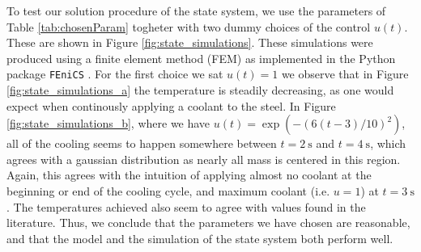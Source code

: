 To test our solution procedure of the state system, we use the parameters of Table \ref{tab:chosenParam} togheter with two dummy choices of the control $u(t)$. These are shown in Figure \ref{fig:state_simulations}. These simulations were produced using a finite element method (FEM) as implemented in the Python package \verb|FEniCS| \cite{fenics}. For the first choice we sat $u(t) = 1$ we observe that in Figure \ref{fig:state_simulations_a} the temperature is steadily decreasing, as one would expect when continously applying a coolant to the steel. In Figure \ref{fig:state_simulations_b}, where we have $u(t) =\exp{\left(-\left(6(t-3)/10\right)^2\right)}$, all of the cooling seems to happen somewhere between $t=\SI{2}{\second}$ and $t=\SI{4}{\second}$, which agrees with a gaussian distribution as nearly all mass is centered in this region. Again, this agrees with the intuition of applying almost no coolant at the beginning or end of the cooling cycle, and maximum coolant (i.e. $u=1$) at $t=\SI{3}{\second}$. The temperatures achieved also seem to agree with values found in the literature. Thus, we conclude that the parameters we have chosen are reasonable, and that the model and the simulation of the state system both perform well.
